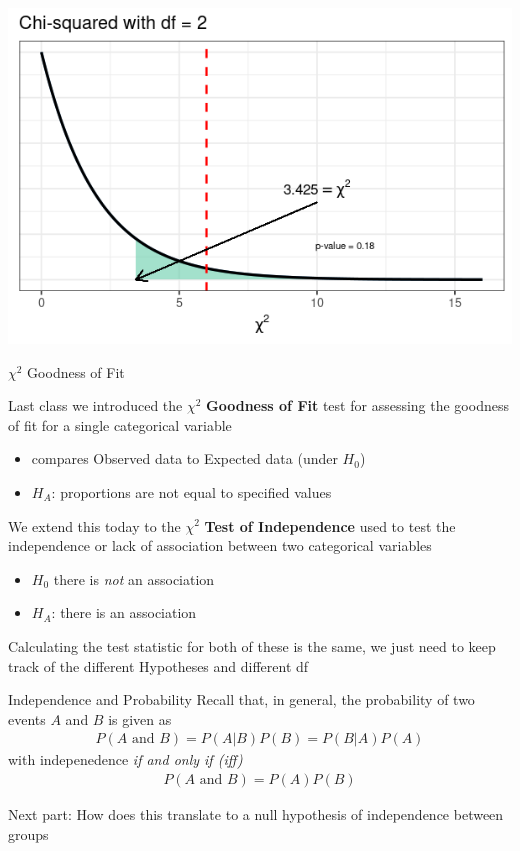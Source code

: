 \documentclass{beamer}
\begin{document}
\begin{frame}
\begin{center}
\includegraphics[scale=0.5]{chi4.png}
\end{center}
\end{frame}

\begin{frame}{$\chi^2$ Goodness of Fit}

Last class we introduced the $\chi^2$ \textbf{Goodness of Fit} test for assessing the goodness of fit for a single categorical variable
\begin{itemize}
    \item compares Observed data to Expected data (under $H_0$)
    \item $H_A$: proportions are not equal to specified values
\end{itemize}
\vspace{8mm}

We extend this today to the $\chi^2$ \textbf{Test of Independence} used to test the independence or lack of association between two categorical variables 
\begin{itemize}
    \item $H_0$ there is \textit{not} an association
    \item $H_A$: there is an association
\end{itemize}\vspace{6mm}

Calculating the test statistic for both of these is the same, we just need to keep track of the different Hypotheses and different df

\end{frame}

\begin{frame}{Independence and Probability}
Recall that, in general, the probability of two events $A$ and $B$ is given as
\begin{align*}
P(A \text{ and } B) = P(A|B)P(B) = P(B|A)P(A)
\end{align*}
with indepenedence \textit{if and only if (iff)}
\begin{align*}
P(A \text{ and } B) = P(A)P(B)
\end{align*} \vspace{4mm}

Next part: How does this translate to  a null hypothesis of independence between groups
\end{frame}
\end{document}
